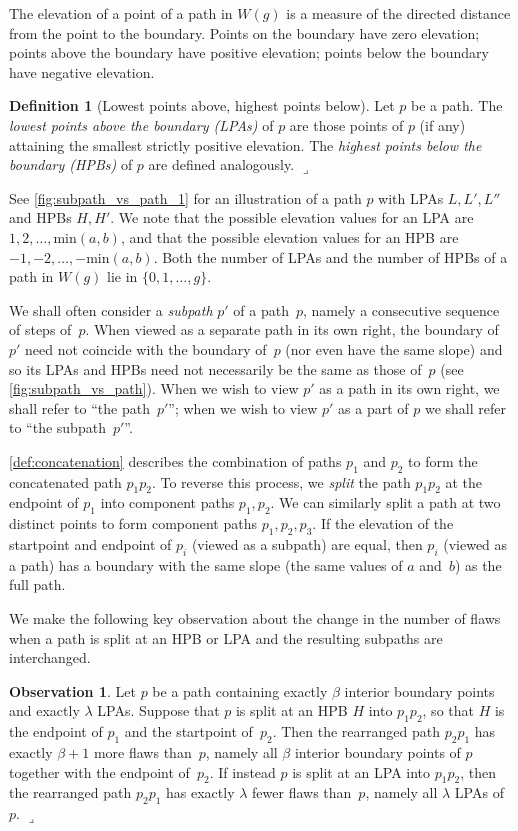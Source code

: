 \documentclass[11pt]{article}
\newcommand{\lrcornerqed}[0]{}
\renewcommand{\lrcornerqed}[0]{\hfill $\lrcorner$} %
\theoremstyle{definition} %
\newtheorem{definition}[thm]{Definition}
\numberwithin{equation}{section}
\newtheorem{obs}[thm]{Observation}
\begin{document}
The elevation of a point of a path in $W(g)$ is a measure of the directed distance from the point to the boundary. 
Points on the boundary have zero elevation; points above the boundary have positive elevation;  points below the boundary have negative elevation.

\begin{definition}[Lowest points above, highest points below]
\label{def:hpblpa}
    Let $p$ be a path.  
    The \textit{lowest points above the boundary (LPAs)} of $p$ are those points of $p$ (if any) 
    attaining the smallest strictly positive elevation.
    The \textit{highest points below the boundary (HPBs)} of $p$ are defined analogously.
\lrcornerqed
\end{definition}


See \cref{fig:subpath_vs_path_1} for an illustration of a path $p$ with LPAs $L,L',L''$ and HPBs $H,H'$. We note that the possible elevation values for an LPA are $1,2,\dots,\mathrm{min}(a,b)$, and that the possible elevation values for an HPB are $-1,-2,\dots,-\mathrm{min}(a,b)$.
Both the number of LPAs and the number of HPBs of a path in $W(g)$ lie in $\{0,1,\dots, g\}$.

We shall often consider a \textit{subpath} $p'$ of a path~$p$, namely a consecutive sequence of steps of~$p$. When viewed as a separate path in its own right, the boundary of $p'$ need not coincide with the boundary of~$p$ (nor even have the same slope) and so its LPAs and HPBs need not necessarily be the same as those of~$p$ (see \cref{fig:subpath_vs_path}). When we wish to view $p'$ as a path in its own right, we shall refer to ``the path~$p'$'';  when we wish to view $p'$ as a part of $p$ we shall refer to ``the subpath~$p'$''.

\cref{def:concatenation} describes the combination of paths $p_1$ and $p_2$ to form the concatenated path $p_1p_2$. To reverse this process, we \textit{split} the path $p_1p_2$ at the endpoint of $p_1$ into component paths $p_1, p_2$. We can similarly split a path at two distinct points to form component paths $p_1, p_2, p_3$. 
If the elevation of the startpoint and endpoint of $p_i$ (viewed as a subpath) are equal, then $p_i$ (viewed as a path) has a boundary with the same slope (the same values of $a$ and~$b$) as the full path.

We make the following key observation about the change in the number of flaws when a path is split at an HPB or LPA and the resulting subpaths are interchanged.

\begin{obs}\label{obs:flaws}
    Let $p$ be a path containing exactly $\beta$ interior boundary points and exactly $\lambda$ LPAs.
    Suppose that $p$ is split at an HPB $H$ into $p_1p_2$, so that $H$ is the endpoint of $p_1$ and the startpoint of~$p_2$. Then the rearranged path $p_2p_1$ has exactly $\beta+1$ more flaws than~$p$, namely all $\beta$ interior boundary points of $p$ together with the endpoint of~$p_2$.
    If instead $p$ is split at an LPA into $p_1p_2$, then the rearranged path $p_2p_1$ has exactly $\lambda$ fewer flaws than~$p$, namely all $\lambda$ LPAs of~$p$.
    \lrcornerqed
\end{obs}
\end{document}
